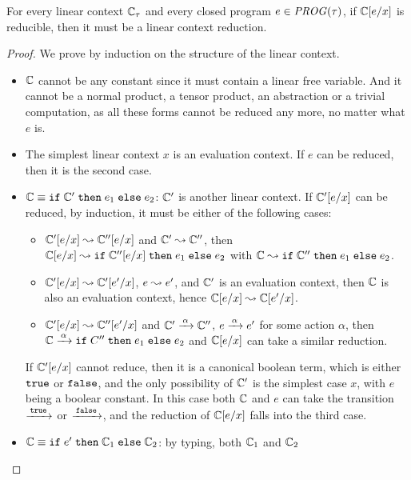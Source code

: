 \documentclass[10pt,a4]{article}
\begin{document}
\begin{lemma}
For every linear context $\mathbb{C}_\tau$ and every closed program $e \in \mathit{PROG}(\tau)$, if 
$\mathbb{C}[e / x]$ is reducible, then it must be a linear context reduction.
\end{lemma}
%
\begin{proof}
We prove by induction on the structure of the linear context. 

\begin{itemize}
\item $\mathbb{C}$ cannot be any constant since it must contain a linear free variable. And it cannot be 
  a normal product, a tensor product, an abstraction or a trivial computation, as all these forms 
  cannot be reduced any more, no matter what $e$ is.
\item The simplest linear context $x$ is an evaluation context. If $e$ can be reduced, 
  then it is the second case.
\item $\mathbb{C} \equiv \mathtt{if} \; {\mathbb{C}'} \; \mathtt{then} \; {e_1} \; \mathtt{else} \; {e_2}$: $\mathbb{C}'$ is another linear context.
  If $\mathbb{C}'[e / x]$ can be reduced, by induction, it must be either of the following cases:
  \begin{itemize}
  \item $\mathbb{C}'[e / x] \leadsto \mathbb{C}''[e / x]$ and $\mathbb{C}' \leadsto \mathbb{C}''$,
    then $\mathbb{C}[e/x] \leadsto \mathtt{if} \; {\mathbb{C}''[e/x]} \; \mathtt{then} \; {e_1} \; \mathtt{else} \; {e_2}$ with 
    $\mathbb{C} \leadsto \mathtt{if} \; {\mathbb{C}''} \; \mathtt{then} \; {e_1} \; \mathtt{else} \; {e_2}$.
  \item $\mathbb{C}'[e/x] \leadsto \mathbb{C}'[e'/x]$, $e \leadsto e'$, and $\mathbb{C}'$ is an evaluation context, 
    then $\mathbb{C}$ is also an evaluation context, hence $\mathbb{C}[e/x] \leadsto \mathbb{C}[e'/x]$.
  \item $\mathbb{C}'[e/x] \leadsto \mathbb{C}''[e'/x]$ and $\mathbb{C}' \xrightarrow{\,{\alpha}\,} \mathbb{C}''$, 
    $e \xrightarrow{\,{\alpha}\,} e'$ for some action $\alpha$, then $\mathbb{C} \xrightarrow{\,{\alpha}\,} \mathtt{if} \; {C''} \; \mathtt{then} \; {e_1} \; \mathtt{else} \; {e_2}$ 
    and $\mathbb{C}[e / x]$ can take a similar reduction.
  \end{itemize}
  If $\mathbb{C}'[e / x]$ cannot reduce, then it is a canonical boolean term, which is either $\mathtt{true}$ 
  or $\mathtt{false}$, 
  and the only possibility of $\mathbb{C}'$ is the simplest case $x$, with $e$ being a boolear constant. 
  In this case both $\mathbb{C}$ and $e$ can take the transition $\xrightarrow{\,{\mathtt{true}}\,}$ or $\xrightarrow{\,{\mathtt{false}}\,}$, 
  and the reduction of $\mathbb{C}[e / x]$ falls into the third case.
\item $\mathbb{C} \equiv \mathtt{if} \; {e'} \; \mathtt{then} \; {\mathbb{C}_1} \; \mathtt{else} \; {\mathbb{C}_2}$: by typing, both $\mathbb{C}_1$ and $\mathbb{C}_2$ 

\end{itemize}
\end{proof}
\end{document}
